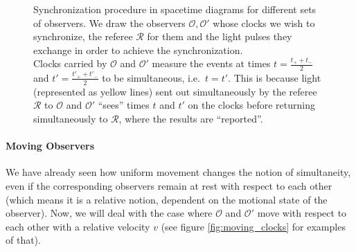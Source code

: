 \begin{figure}
\begin{minipage}{0.5\textwidth}
{
		}
	\end{minipage}%
	\begin{minipage}{0.5\textwidth}
		\caption[Synchronization procedure in spacetime diagrams for different sets of observers]{Synchronization procedure in spacetime diagrams for different sets of observers. We draw the observers $\mathcal{O}, \mathcal{O}'$ whose clocks we wish to synchronize, the referee $\mathcal{R}$ for them and the light pulses they exchange in order to achieve the synchronization.\\
		Clocks carried by $\mathcal{O}$ and $\mathcal{O}'$ measure the events at times $t = \frac{t_+ + t_-}{2}$ and $t' = \frac{t'_+ + t'_-}{2}$ to be simultaneous, i.e.~$t = t'$. This is because light (represented as yellow lines) sent out simultaneously by the referee $\mathcal{R}$ to $\mathcal{O}$ and $\mathcal{O}'$ \enquote{sees} times $t$ and $t'$ on the clocks before returning simultaneously to $\mathcal{R}$, where the results are \enquote{reported}.}
		\label{fig:clocks_at_rest_wrt_each_other}
	\end{minipage}
\end{figure}



			\paragraph{Moving Observers}
We have already seen how uniform movement changes the notion of simultaneity, even if the corresponding observers remain at rest with respect to each other (which means it is a relative notion, dependent on the motional state of the observer). Now, we will deal with the case where $\mathcal{O}$ and $\mathcal{O}'$ move with respect to each other with a relative velocity $v$ (see figure \ref{fig:moving_clocks} for examples of that).

